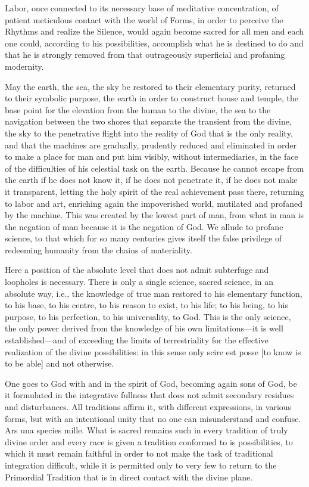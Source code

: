 Labor, once connected to its necessary base of meditative concentration, of patient meticulous contact with the world of Forms, in order to perceive the Rhythms and realize the Silence, would again become sacred for all men and each one could, according to his possibilities, accomplish what he is destined to do and that he is strongly removed from that outrageously superficial and profaning modernity.

May the earth, the sea, the sky be restored to their elementary purity, returned to their symbolic purpose, the earth in order to construct house and temple, the base point for the elevation from the human to the divine, the sea to the navigation between the two shores that separate the transient from the divine, the sky to the penetrative flight into the reality of God that is the only reality, and that the machines are gradually, prudently reduced and eliminated in order to make a place for man and put him visibly, without intermediaries, in the face of the difficulties of his celestial task on the earth. Because he cannot escape from the earth if he does not know it, if he does not penetrate it, if he does not make it transparent, letting the holy spirit of the real achievement pass there, returning to labor and art, enriching again the impoverished world, mutilated and profaned by the machine. This was created by the lowest part of man, from what in man is the negation of man because it is the negation of God. We allude to profane science, to that which for so many centuries gives itself the false privilege of redeeming humanity from the chains of materiality.

Here a position of the absolute level that does not admit subterfuge and loopholes is necessary. There is only a single science, sacred science, in an absolute way, i.e., the knowledge of true man restored to his elementary function, to his base, to his centre, to his reason to exist, to his life; to his being, to his purpose, to his perfection, to his universality, to God. This is the only science, the only power derived from the knowledge of his own limitations—it is well established—and of exceeding the limits of terrestriality for the effective realization of the divine possibilities: in this sense only scire est posse [to know is to be able] and not otherwise.

One goes to God with and in the spirit of God, becoming again sons of God, be it formulated in the integrative fullness that does not admit secondary residues and disturbances. All traditions affirm it, with different expressions, in various forms, but with an intentional unity that no one can misunderstand and confuse. Ars una species mille. What is sacred remains such in every tradition of truly divine order and every race is given a tradition conformed to is possibilities, to which it must remain faithful in order to not make the task of traditional integration difficult, while it is permitted only to very few to return to the Primordial Tradition that is in direct contact with the divine plane.

